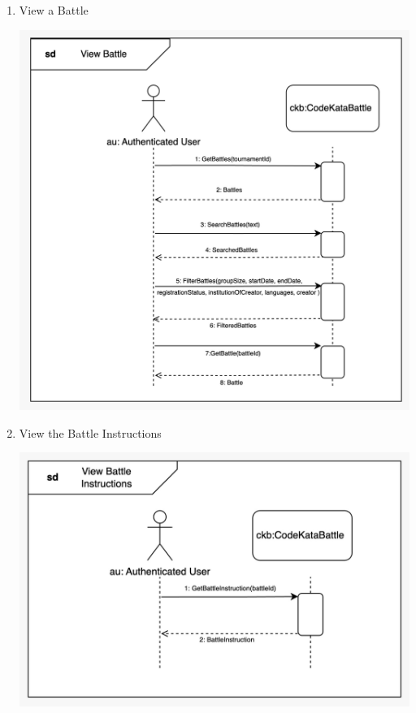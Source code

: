 \begin{enumerate}
\begin{center}
    \end{center}
    \newpage
    \item View a Battle
    \begin{center}
            \includegraphics[scale=0.2]{Images/sequence_diagrams/SD-view_battle.jpeg}
    \end{center}
    \item View the Battle Instructions
    \begin{center}
            \includegraphics[scale=0.2]{Images/sequence_diagrams/SD-view_battle_instructions.jpeg}
    \end{center}

\end{enumerate}
